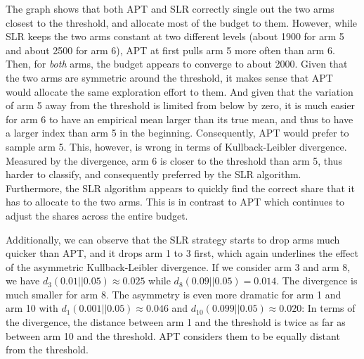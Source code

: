 \documentclass[11pt,]{article}
\begin{document}
The graph shows that both APT and SLR correctly single out the two arms
closest to the threshold, and allocate most of the budget to them.
However, while SLR keeps the two arms constant at two different levels
(about 1900 for arm 5 and about 2500 for arm 6), APT at first pulls arm
5 more often than arm 6. Then, for \emph{both} arms, the budget appears
to converge to about 2000. Given that the two arms are symmetric around
the threshold, it makes sense that APT would allocate the same
exploration effort to them. And given that the variation of arm 5 away
from the threshold is limited from below by zero, it is much easier for
arm 6 to have an empirical mean larger than its true mean, and thus to
have a larger index than arm 5 in the beginning. Consequently, APT would
prefer to sample arm 5. This, however, is wrong in terms of
Kullback-Leibler divergence. Measured by the divergence, arm 6 is closer
to the threshold than arm 5, thus harder to classify, and consequently
preferred by the SLR algorithm. Furthermore, the SLR algorithm appears
to quickly find the correct share that it has to allocate to the two
arms. This is in contrast to APT which continues to adjust the shares
across the entire budget.

Additionally, we can observe that the SLR strategy starts to drop arms
much quicker than APT, and it drops arm 1 to 3 first, which again
underlines the effect of the asymmetric Kullback-Leibler divergence. If
we consider arm 3 and arm 8, we have \(d_3(0.01||0.05) \approx 0.025\)
while \(d_8(0.09||0.05) = 0.014\). The divergence is much smaller for
arm 8. The asymmetry is even more dramatic for arm 1 and arm 10 with
\(d_1(0.001||0.05) \approx 0.046\) and
\(d_{10}(0.099||0.05) \approx 0.020\): In terms of the divergence, the
distance between arm 1 and the threshold is twice as far as between arm
10 and the threshold. APT considers them to be equally distant from the
threshold.
\end{document}
